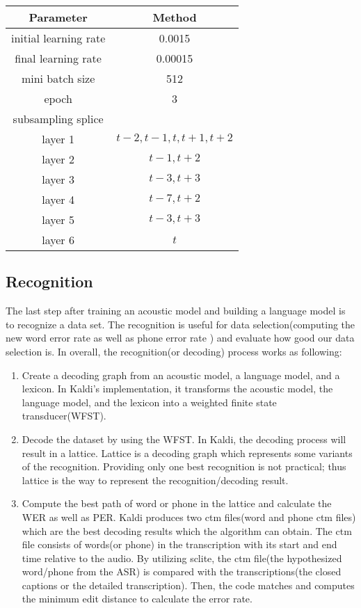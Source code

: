\begin{center}
\label{TDNNparams}
\begin{tabular}{ | c | c | }
\hline
\textbf{Parameter} & \textbf{Method}  \\  \hline \hline
initial learning rate & 0.0015 \\
final learning rate & 0.00015 \\ \hline
mini batch size & 512 \\ \hline
epoch & 3 \\ \hline
subsampling splice & \\
layer 1 & $t-2,t-1,t,t+1,t+2$ \\
layer 2 & $t-1,t+2$ \\
layer 3 & $t-3,t+3$ \\
layer 4 & $t-7,t+2$ \\
layer 5 & $t-3,t+3$ \\
layer 6 & $t$ \\  \hline
\end{tabular}
\end{center}


\subsection{Recognition}
The last step after training an acoustic model and building a language model is to recognize a data set. The recognition is useful for data selection(computing the new word error rate as well as phone error rate ) and evaluate how good our data selection is. In overall, the recognition(or decoding) process works as following:
\begin{enumerate}
\item Create a decoding graph from an acoustic model, a language model, and a lexicon. In Kaldi's implementation, it transforms the  acoustic model, the language model, and the lexicon into a weighted finite state transducer(WFST).
\item Decode the dataset by using the WFST. In Kaldi, the decoding process will result in a lattice. Lattice is a decoding graph which represents some variants of the recognition. Providing only one best recognition is not practical; thus lattice is the way to represent the recognition/decoding result. 
\item Compute the best path of word or phone in the lattice and calculate the WER as well as PER. Kaldi produces two ctm files(word and phone ctm files) which are the best decoding results which the algorithm can obtain. The ctm file consists of words(or phone) in the transcription with its start and end time relative to the audio. By utilizing sclite, the ctm file(the hypothesized word/phone from the ASR) is compared with the transcriptions(the closed captions or the detailed transcription). Then, the code matches and computes the minimum edit distance to calculate the error rate.
\end{enumerate}

